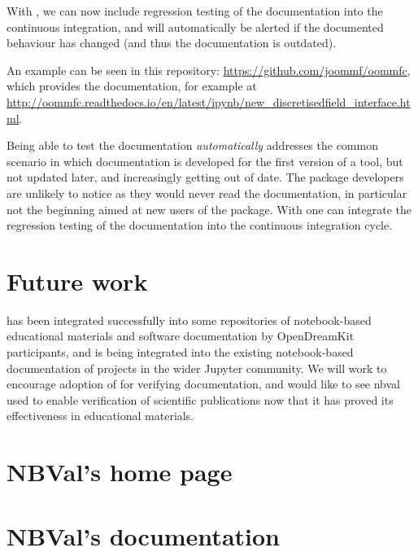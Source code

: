 \documentclass{deliverablereport}
\begin{document}
With \nbval, we can now include regression testing of the
documentation into the continuous integration, and will automatically
be alerted if the documented behaviour has changed (and thus the
documentation is outdated).

An example can be seen in this repository:
\href{https://github.com/joommf/oommfc}{https://github.com/joommf/oommfc},
which provides the documentation, for example at\linebreak
\href{http://oommfc.readthedocs.io/en/latest/ipynb/new_discretisedfield_interface.html}{http://oommfc.readthedocs.io/en/latest/ipynb/new\_discretisedfield\_interface.html}.

Being able to test the documentation \emph{automatically} addresses
the common scenario in which documentation is developed for the first
version of a tool, but not updated later, and increasingly getting out
of date. The package developers are unlikely to notice as they would
never read the documentation, in particular not the beginning aimed at
new users of the package. With \nbval one can integrate the regression
testing of the documentation into the continuous integration cycle.


\section{Future work} %

\nbval has been integrated successfully into some repositories of
notebook-based educational materials and software documentation by
OpenDreamKit participants, and is being integrated into the existing
notebook-based documentation of projects in the wider Jupyter
community.  We will work to encourage adoption of \nbval for verifying
documentation, and would like to see nbval used to enable verification
of scientific publications now that it has proved its effectiveness in
educational materials.

\clearpage
\appendix
\section{NBVal's home page}



\section{NBVal's documentation}


\end{document}
